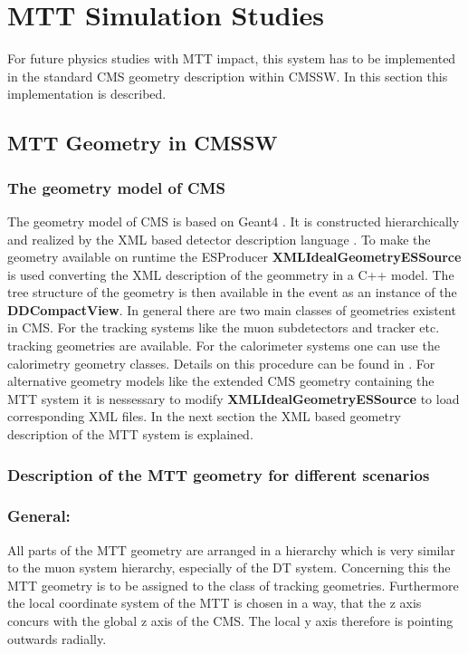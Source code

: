\section{MTT Simulation Studies}
	For future physics studies with MTT impact, this system has to be implemented in the standard CMS geometry description within CMSSW.
	In this section this implementation is described. 
	\subsection{MTT Geometry in CMSSW}
		\subsubsection{The geometry model of CMS}
			The geometry model of CMS is based on Geant4 \cite{Geant4}.
			It is constructed hierarchically and realized by the XML based detector description language \cite{CMSDDL}.
			To make the geometry available on runtime the ESProducer \textbf{XMLIdealGeometryESSource} is used converting the XML description of the geommetry in a C++ model.
			The tree structure of the geometry is then available in the event as an instance of the \textbf{DDCompactView}.
			In general there are two main classes of geometries existent in CMS.
			For the tracking systems like the muon subdetectors and tracker etc. tracking geometries are available.
			For the calorimeter systems one can use the calorimetry geometry classes.
			Details on this procedure can be found in \cite{CMSDDL}.
			For alternative geometry models like the extended CMS geometry containing the MTT system it is nessessary to modify \textbf{XMLIdealGeometryESSource} to load corresponding XML files.
			In the next section the XML based geometry description of the MTT system is explained.
		\subsubsection{Description of the MTT geometry for different scenarios}
			\subsubsection*{General:}
			All parts of the MTT geometry are arranged in a hierarchy which is very similar to the muon system hierarchy, especially of the DT system.
			Concerning this the MTT geometry is to be assigned to the class of tracking geometries.
			Furthermore the local coordinate system of the MTT is chosen in a way, that the z axis concurs with the global z axis of the CMS.
			The local y axis therefore is pointing outwards radially.
